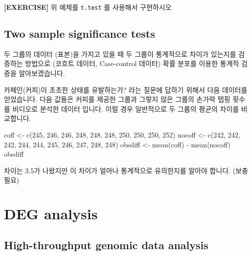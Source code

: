 \documentclass[
]{book}
\newenvironment{Shaded}{\begin{snugshade}}{\end{snugshade}}
\newcommand{\DecValTok}[1]{\textcolor[rgb]{0.00,0.00,0.81}{#1}}
\newcommand{\FunctionTok}[1]{\textcolor[rgb]{0.00,0.00,0.00}{#1}}
\newcommand{\NormalTok}[1]{#1}
\newcommand{\OtherTok}[1]{\textcolor[rgb]{0.56,0.35,0.01}{#1}}
\newcommand{\SpecialCharTok}[1]{\textcolor[rgb]{0.00,0.00,0.00}{#1}}
\begin{document}
\textbf{{[}EXERCISE{]}} 위 예제를 \texttt{t.test} 를 사용해서 구현하시오

\hypertarget{two-sample-significance-tests}{%
\section{Two sample significance tests}\label{two-sample-significance-tests}}

두 그룹의 데이터 (표본)을 가지고 있을 때 두 그룹이 통계적으로 차이가 있는지를 검증하는 방법으로 (코흐트 데이터, Case-control 데이터) 확률 분포를 이용한 통계적 검증을 알아보겠습니다.

카페인(커피)이 초초한 상태를 유발하는가? 라는 질문에 답하기 위해서 다음 데이터를 얻었습니다. 다음 값들은 커피를 제공한 그룹과 그렇지 않은 그룹의 손가락 탭핑 횟수를 비디오로 분석한 데이터 입니다. 이럴 경우 일반적으로 두 그룹의 평균의 차이를 비교합니다.

\begin{Shaded}
\begin{Highlighting}[]
\NormalTok{coff }\OtherTok{\textless{}{-}} \FunctionTok{c}\NormalTok{(}\DecValTok{245}\NormalTok{, }\DecValTok{246}\NormalTok{, }\DecValTok{246}\NormalTok{, }\DecValTok{248}\NormalTok{, }\DecValTok{248}\NormalTok{, }\DecValTok{248}\NormalTok{, }\DecValTok{250}\NormalTok{, }\DecValTok{250}\NormalTok{, }\DecValTok{250}\NormalTok{, }\DecValTok{252}\NormalTok{)}
\NormalTok{nocoff }\OtherTok{\textless{}{-}} \FunctionTok{c}\NormalTok{(}\DecValTok{242}\NormalTok{, }\DecValTok{242}\NormalTok{, }\DecValTok{242}\NormalTok{, }\DecValTok{244}\NormalTok{, }\DecValTok{244}\NormalTok{, }\DecValTok{245}\NormalTok{, }\DecValTok{246}\NormalTok{, }\DecValTok{247}\NormalTok{, }\DecValTok{248}\NormalTok{, }\DecValTok{248}\NormalTok{)}
\NormalTok{obsdiff }\OtherTok{\textless{}{-}} \FunctionTok{mean}\NormalTok{(coff) }\SpecialCharTok{{-}} \FunctionTok{mean}\NormalTok{(nocoff)}
\NormalTok{obsdiff}
\end{Highlighting}
\end{Shaded}

차이는 3.5가 나왔지만 이 차이가 얼마나 통계적으로 유의한지를 알아야 합니다. (보충 필요)

\hypertarget{deg-analysis}{%
\chapter{DEG analysis}\label{deg-analysis}}

\hypertarget{high-throughput-genomic-data-analysis}{%
\section{High-throughput genomic data analysis}\label{high-throughput-genomic-data-analysis}}
\end{document}
